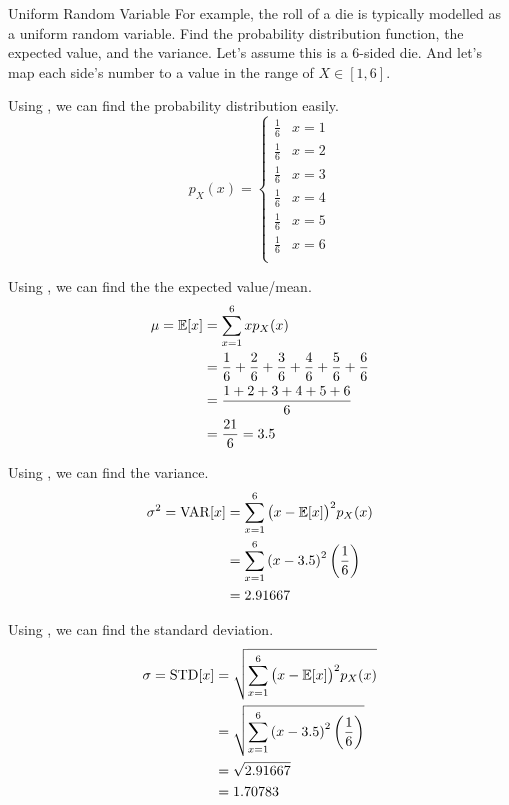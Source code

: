 \begin{example}[Lecture 1]{Uniform Random Variable}
  For example, the roll of a die is typically modelled as a uniform random variable.
  Find the probability distribution function, the expected value, and the variance.
  \tcblower{}
  Let's assume this is a 6-sided die.
  And let's map each side's number to a value in the range of $X \in [1, 6]$.

  Using , we can find the probability distribution easily.
  \begin{equation*}
    p_{X}(x) =
    \begin{cases}
      \frac{1}{6} & x = 1 \\
      \frac{1}{6} & x = 2 \\
      \frac{1}{6} & x = 3 \\
      \frac{1}{6} & x = 4 \\
      \frac{1}{6} & x = 5 \\
      \frac{1}{6} & x = 6 \\
    \end{cases}
  \end{equation*}

  Using , we can find the the expected value/mean.
  \begin{equation*}
    \begin{aligned}
      \mu = \operatorname{\operatorname{\mathbb{E}}}[x] &= \sum\limits_{x=1}^{6}x p_{X}(x) \\
      &= \frac{1}{6} + \frac{2}{6} + \frac{3}{6} + \frac{4}{6} + \frac{5}{6} + \frac{6}{6} \\
      &= \frac{1+2+3+4+5+6}{6} \\
      &= \frac{21}{6} = 3.5
    \end{aligned}
  \end{equation*}

  Using , we can find the variance.
  \begin{equation*}
    \begin{aligned}
      \sigma^{2} = \operatorname{\operatorname{VAR}}[x] &= \sum\limits_{x=1}^{6} {\bigl(x - \operatorname{\operatorname{\mathbb{E}}}[x] \bigr)}^{2} p_{X}(x) \\
      &= \sum\limits_{x=1}^{6} {(x-3.5)}^{2} \left( \frac{1}{6} \right) \\
      &= 2.91667
    \end{aligned}
  \end{equation*}

  Using , we can find the standard deviation.
  \begin{equation*}
    \begin{aligned}
      \sigma = \operatorname{\operatorname{STD}}[x]&= \sqrt{\sum\limits_{x=1}^{6} {\bigl(x - \operatorname{\operatorname{\mathbb{E}}}[x] \bigr)}^{2} p_{X}(x)} \\
      &= \sqrt{\sum\limits_{x=1}^{6} {(x-3.5)}^{2} \left( \frac{1}{6} \right)} \\
      &= \sqrt{2.91667} \\
      &= 1.70783
    \end{aligned}
  \end{equation*}
\end{example}

